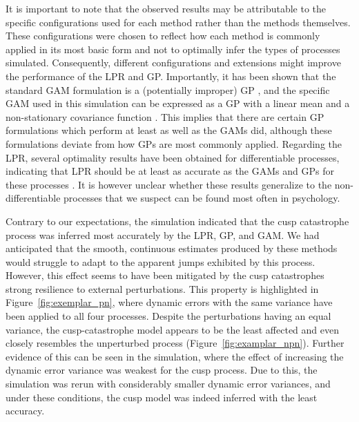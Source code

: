 \documentclass[man, floatsintext]{apa7}
\begin{document}
It is important to note that the observed results may be attributable to the
specific configurations used for each method rather than the methods
themselves. These configurations were chosen to reflect how each method is
commonly applied in its most basic form and not to optimally infer the types of
processes simulated. Consequently, different configurations and extensions
might improve the performance of the LPR and GP\@. Importantly, it has been
shown that the standard GAM formulation is a (potentially improper) GP
\parencite{wahba_improper_1978}, and the specific GAM used in this simulation
can be expressed as a GP with a linear mean and a non-stationary covariance
function \parencite{rasmussen_gaussian_2006}. This implies that there are
certain GP formulations which perform at least as well as the GAMs did,
although these formulations deviate from how GPs are most commonly applied.
Regarding the LPR, several optimality results have been obtained for
differentiable processes, indicating that LPR should be at least as accurate as
the GAMs and GPs for these processes \parencite{fan_local_1997}. It is however
unclear whether these results generalize to the non-differentiable processes
that we suspect can be found most often in psychology.

Contrary to our expectations, the simulation indicated that the cusp
catastrophe process was inferred most accurately by the LPR, GP, and GAM\@. We
had anticipated that the smooth, continuous estimates produced by these methods
would struggle to adapt to the apparent jumps exhibited by this process.
However, this effect seems to have been mitigated by the cusp catastrophes
strong resilience to external perturbations. This property is highlighted in
Figure~\ref{fig:exemplar_pn}, where dynamic errors with the same variance have
been applied to all four processes. Despite the perturbations having an equal
variance, the cusp-catastrophe model appears to be the least affected and even
closely resembles the unperturbed process (Figure~\ref{fig:examplar_npn}).
Further evidence of this can be seen in the simulation, where the effect of
increasing the dynamic error variance was weakest for the cusp process. Due to
this, the simulation was rerun with considerably smaller dynamic error
variances, and under these conditions, the cusp model was indeed inferred with
the least accuracy.
\end{document}
